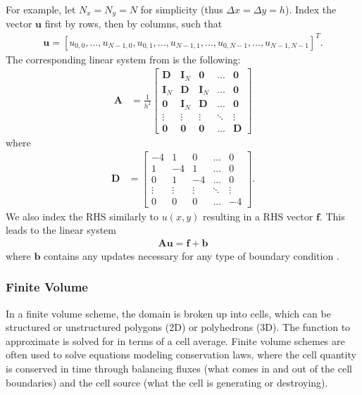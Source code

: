 For example, let $N_x = N_y = N$ for simplicity (thus $\Delta x = \Delta y = h$). Index the vector $\textbf{u}$ first by rows, then by columns, such that
\begin{align}
    \textbf{u} = [u_{0,0}, ..., u_{N - 1, 0}, u_{0, 1}, ..., u_{N - 1, 1}, ..., u_{0, N - 1}, ..., u_{N - 1, N - 1}]^T.
\end{align}
The corresponding linear system from  is the following:
\begin{align}
    \textbf{A} &= \frac{1}{h^2}
    \begin{bmatrix}
        \textbf{D} & \textbf{I}_{N} & \textbf{0} & ... & \textbf{0} \\
        \textbf{I}_{N} & \textbf{D} & \textbf{I}_{N} & ... & \textbf{0} \\
        \textbf{0} & \textbf{I}_{N} & \textbf{D} & ... & \textbf{0} \\
        \vdots & \vdots & \vdots & \ddots & \vdots \\
        \textbf{0} & \textbf{0} & \textbf{0} & ... & \textbf{D}
    \end{bmatrix}
\end{align}
where
\begin{align}
    \textbf{D} &= 
    \begin{bmatrix}
        -4 & 1 & 0 & ... & 0 \\
        1 & -4 & 1 & ... & 0 \\
        0 & 1 & -4 & ... & 0 \\
        \vdots & \vdots & \vdots & \ddots & \vdots \\
        0 & 0 & 0 & ... & -4
    \end{bmatrix}.
\end{align}
We also index the RHS similarly to $u(x,y)$ resulting in a RHS vector $\textbf{f}$. This leads to the linear system
\begin{align}
    \textbf{A} \textbf{u} = \textbf{f} + \textbf{b}
\end{align}
where $\textbf{b}$ contains any updates necessary for any type of boundary condition \citep{leveque2007finite}.

\subsubsection{Finite Volume}

In a finite volume scheme, the domain is broken up into cells, which can be structured or unstructured polygons (2D) or polyhedrons (3D). The function to approximate is solved for in terms of a cell average. Finite volume schemes are often used to solve equations modeling conservation laws, where the cell quantity is conserved in time through balancing fluxes (what comes in and out of the cell boundaries) and the cell source (what the cell is generating or destroying).

